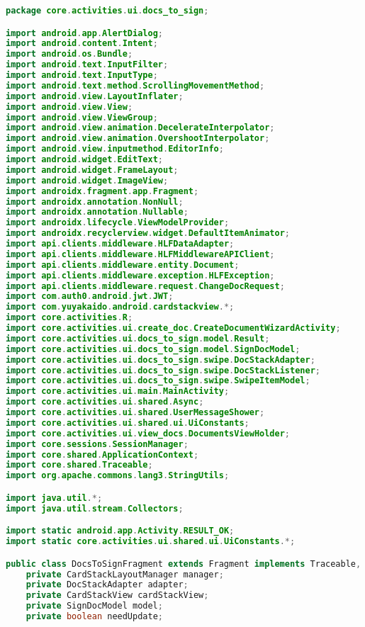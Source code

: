 \begin{lstlisting}[language=Java]
package core.activities.ui.docs_to_sign;

import android.app.AlertDialog;
import android.content.Intent;
import android.os.Bundle;
import android.text.InputFilter;
import android.text.InputType;
import android.text.method.ScrollingMovementMethod;
import android.view.LayoutInflater;
import android.view.View;
import android.view.ViewGroup;
import android.view.animation.DecelerateInterpolator;
import android.view.animation.OvershootInterpolator;
import android.view.inputmethod.EditorInfo;
import android.widget.EditText;
import android.widget.FrameLayout;
import android.widget.ImageView;
import androidx.fragment.app.Fragment;
import androidx.annotation.NonNull;
import androidx.annotation.Nullable;
import androidx.lifecycle.ViewModelProvider;
import androidx.recyclerview.widget.DefaultItemAnimator;
import api.clients.middleware.HLFDataAdapter;
import api.clients.middleware.HLFMiddlewareAPIClient;
import api.clients.middleware.entity.Document;
import api.clients.middleware.exception.HLFException;
import api.clients.middleware.request.ChangeDocRequest;
import com.auth0.android.jwt.JWT;
import com.yuyakaido.android.cardstackview.*;
import core.activities.R;
import core.activities.ui.create_doc.CreateDocumentWizardActivity;
import core.activities.ui.docs_to_sign.model.Result;
import core.activities.ui.docs_to_sign.model.SignDocModel;
import core.activities.ui.docs_to_sign.swipe.DocStackAdapter;
import core.activities.ui.docs_to_sign.swipe.DocStackListener;
import core.activities.ui.docs_to_sign.swipe.SwipeItemModel;
import core.activities.ui.main.MainActivity;
import core.activities.ui.shared.Async;
import core.activities.ui.shared.UserMessageShower;
import core.activities.ui.shared.ui.UiConstants;
import core.activities.ui.view_docs.DocumentsViewHolder;
import core.sessions.SessionManager;
import core.shared.ApplicationContext;
import core.shared.Traceable;
import org.apache.commons.lang3.StringUtils;

import java.util.*;
import java.util.stream.Collectors;

import static android.app.Activity.RESULT_OK;
import static core.activities.ui.shared.ui.UiConstants.*;

public class DocsToSignFragment extends Fragment implements Traceable, UserMessageShower {
	private CardStackLayoutManager manager;
	private DocStackAdapter adapter;
	private CardStackView cardStackView;
	private SignDocModel model;
	private boolean needUpdate;
	

\end{lstlisting}

